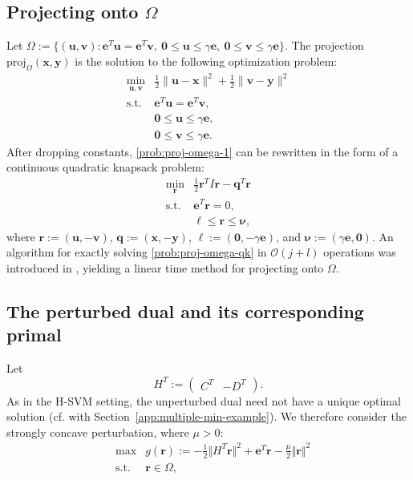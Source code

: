 \documentclass[twoside,11pt]{article}
\newcommand\proj{\mathrm{proj}}
\newcommand\bz{\bm{0}}
\newcommand\q{\bm{q}}
\renewcommand\r{\bm{r}}
\renewcommand\u{\bm{u}}
\renewcommand\v{\bm{v}}
\newcommand\x{\bm{x}}
\newcommand\y{\bm{y}}
\newcommand\e{\bm{e}}
\renewcommand\O{\mathcal{O}}
\newcommand\bnu{\bm{\nu}}
\newcommand\bell{\bm{\ell}}
\begin{document}
\subsection{Projecting onto $\Omega$}
Let $\Omega:=\{(\u,\v):\e^T\u=\e^T\v,\>\bz\le\u\le\gamma\e,\>\bz\le\v\le\gamma\e\}$.
The projection $\proj_{\Omega}(\x,\y)$ is the solution to the following optimization problem:
\begin{equation} \label{prob:proj-omega-1}
  \begin{array}{rll}
    \min_{\u,\v} & \frac{1}{2}\lVert\u-\x\rVert^2 + \frac{1}{2}\lVert\v-\y\rVert^2\\
    \mbox{s.t.} & \e^T\u = \e^T\v,\\
                & \bz\le\u\le\gamma\e,\\
                & \bz\le\v\le\gamma\e.
  \end{array}
\end{equation}
After dropping constants, \eqref{prob:proj-omega-1} can be rewritten in the form of a continuous quadratic knapsack problem:
\begin{equation} \label{prob:proj-omega-qk}
  \begin{array}{rll}
    \min_{\r} & \frac{1}{2}\r^TI\r - \q^T\r\\
    \mbox{s.t.} & \e^T\r = 0,\\
                & \bell\le\r\le\bnu,
  \end{array}
\end{equation}
where $\r := (\u, -\v)$, $\q := (\x,-\y)$, $\bell := (\bz,-\gamma\e)$, and $\bnu := (\gamma\e,\bz)$. An algorithm for exactly solving
\eqref{prob:proj-omega-qk} in $\O(j+l)$ operations was introduced in \cite{Brucker1984}, yielding a linear time method for
projecting onto $\Omega$.

\subsection{The perturbed dual and its corresponding primal}
Let
\[
    H^T := \begin{pmatrix}
        C^T & -D^T
    \end{pmatrix}.
\]
As in the H-SVM setting, the unperturbed dual need not have a unique optimal solution (cf. with Section~\ref{app:multiple-min-example}). We therefore consider the strongly concave perturbation, where $\mu > 0$:
\begin{equation} \label{prob:sm-svm-dual-p}
  \begin{array}{rrl}
    &\max&g(\r):=-\frac{1}{2}\Vert H^T\r\Vert^2 + \e^T\r - \frac{\mu}{2}\Vert\r\Vert^2\\
    &\mbox{s.t.}&\r\in \Omega,
  \end{array}
\end{equation}
\end{document}
